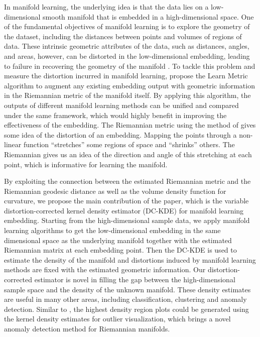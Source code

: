 \documentclass[11pt,a4paper,]{article}
\begin{document}
In manifold learning, the underlying idea is that the data lies on a low-dimensional smooth manifold that is embedded in a high-dimensional space. One of the fundamental objectives of manifold learning is to explore the geometry of the dataset, including the distances between points and volumes of regions of data. These intrinsic geometric attributes of the data, such as distances, angles, and areas, however, can be distorted in the low-dimensional embedding, leading to failure in recovering the geometry of the manifold \autocite{Goldberg2008-co}. To tackle this problem and measure the distortion incurred in manifold learning,
\textcite{Perrault-Joncas2013-pq} propose the Learn Metric algorithm to augment any existing embedding output with geometric information in the Riemannian metric of the manifold itself. By applying this algorithm, the outputs of different manifold learning methods can be unified and compared under the same framework, which would highly benefit in improving the effectiveness of the embedding.
The Riemannian metric using the method of \textcite{Perrault-Joncas2013-pq} gives some idea of the distortion of an embedding. Mapping the points through a non-linear function ``stretches'' some regions of space and ``shrinks'' others. The Riemannian gives us an idea of the direction and angle of this stretching at each point, which is informative for learning the manifold.

By exploiting the connection between the estimated Riemannian metric and the Riemannian geodesic distance as well as the volume density function for curvature, we propose the main contribution of the paper, which is the variable distortion-corrected kernel density estimator (DC-KDE) for manifold learning embedding. Starting from the high-dimensional sample data, we apply manifold learning algorithms to get the low-dimensional embedding in the same dimensional space as the underlying manifold together with the estimated Riemannian matrix at each embedding point. Then the DC-KDE is used to estimate the density of the manifold and distortions induced by manifold learning methods are fixed with the estimated geometric information. Our distortion-corrected estimator is novel in filling the gap between the high-dimensional sample space and the density of the unknown manifold. These density estimates are useful in many other areas, including classification, clustering and anomaly detection. Similar to \textcite{Cheng2021-ex}, the highest density region plots\autocite{Hyndman1996-lk} could be generated using the kernel density estimates for outlier visualization, which brings a novel anomaly detection method for Riemannian manifolds.
\end{document}
